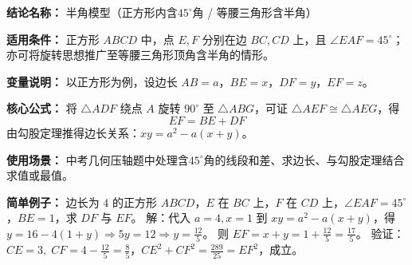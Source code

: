 \textbf{结论名称：} 半角模型（正方形内含\(45^\circ\)角 / 等腰三角形含半角）

\textbf{适用条件：} 正方形 \(ABCD\) 中，点 \(E,F\) 分别在边 \(BC,CD\) 上，且 \(\angle EAF = 45^\circ\)；亦可将旋转思想推广至等腰三角形顶角含半角的情形。

\textbf{变量说明：} 以正方形为例，设边长 \(AB = a\)，\(BE = x\)，\(DF = y\)，\(EF = z\)。

\textbf{核心公式：} 将 \(\triangle ADF\) 绕点 \(A\) 旋转 \(90^\circ\) 至 \(\triangle ABG\)，可证 \(\triangle AEF \cong \triangle AEG\)，得
\[
\boxed{EF = BE + DF}
\]
由勾股定理推得边长关系：\(xy = a^2 - a(x+y)\)。

\textbf{使用场景：} 中考几何压轴题中处理含\(45^\circ\)角的线段和差、求边长、与勾股定理结合求值或最值。

\textbf{简单例子：} 边长为 \(4\) 的正方形 \(ABCD\)，\(E\) 在 \(BC\) 上，\(F\) 在 \(CD\) 上，\(\angle EAF = 45^\circ\)，\(BE=1\)，求 \(DF\) 与 \(EF\)。
解：代入 \(a=4,x=1\) 到 \(xy = a^2 - a(x+y)\)，得
\(y = 16 - 4(1+y) \Rightarrow 5y = 12 \Rightarrow y = \frac{12}{5}\)。
则 \(EF = x+y = 1 + \frac{12}{5} = \frac{17}{5}\)。
验证：\(CE=3,\; CF=4-\frac{12}{5}=\frac{8}{5}\)，\(CE^2+CF^2 = \frac{289}{25} = EF^2\)，成立。